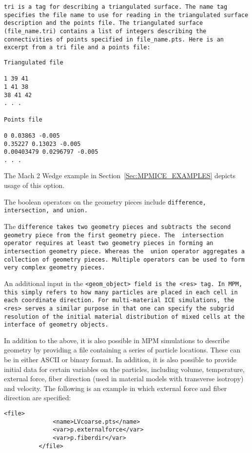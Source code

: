 \tt tri \normalfont is a tag for describing a triangulated surface.
The name tag specifies the file name to use for reading in the
triangulated surface description and the points file.  The
triangulated surface (file\_name.tri) contains a list of integers
describing the connectivities of points specified in file\_name.pts.
Here is an excerpt from a tri file and a points file:

\begin{Verbatim}[fontsize=\footnotesize]
Triangulated file

1 39 41
1 41 38
38 41 42
. . .

Points file

0 0.03863 -0.005
0.35227 0.13023 -0.005
0.00403479 0.0296797 -0.005
. . .
\end{Verbatim}
The Mach 2 Wedge example in Section~\ref{Sec:MPMICE_EXAMPLES} depicts usage of
this option.

The boolean operators on the geometry pieces include \tt difference,
intersection, \normalfont and \tt union.\normalfont

The \tt difference \normalfont takes two geometry pieces and subtracts
the second geometry piece from the first geometry piece.  The \tt
intersection \normalfont operator requires at least two geometry
pieces in forming an intersection geometry piece.  Whereas the \tt
union \normalfont operator aggregates a collection of geometry pieces.
Multiple operators can be used to form very complex geometry pieces.

An additional input in the \tt <geom\_object> \normalfont field is the
\tt <res> \normalfont tag.  In MPM, this simply refers to how many particles
are placed in each cell in each coordinate direction.  For multi-material ICE
simulations, the \tt <res> \normalfont serves a similar purpose in that one
can specify the subgrid resolution of the initial material distribution
of mixed cells at the interface of geometry objects.

In addition to the above, it is also possible in MPM simulations to describe
geometry by providing a file containing a series of particle locations.  These
can be in either ASCII or binary format.  In addition, it is also possible to
provide initial data for certain variables on the particles, including
volume, temperature, external force, fiber direction (used in material models
with transverse isotropy) and velocity.  The following is an example in which
external force and fiber direction are specified:

\begin{Verbatim}[fontsize=\footnotesize]
          <file>
              <name>LVcoarse.pts</name>
              <var>p.externalforce</var>
              <var>p.fiberdir</var>
          </file>
\end{Verbatim}

